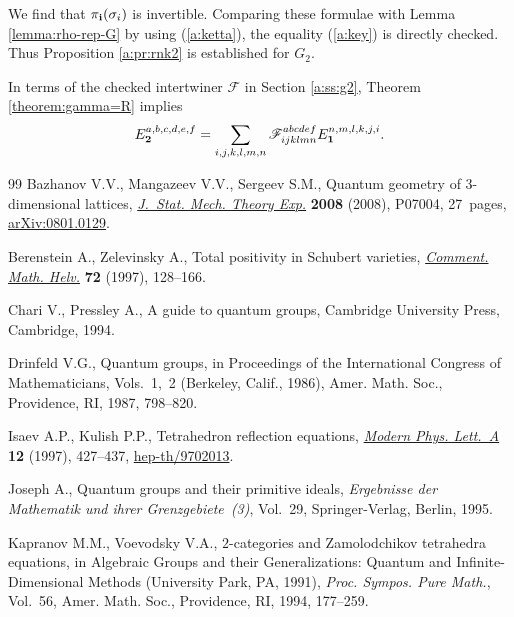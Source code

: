 \documentclass[11pt]{article}
\begin{document}
We f\/ind that $\pi_{\bf i}(\sigma_i)$ is invertible.
Comparing these formulae with Lemma \ref{lemma:rho-rep-G}
by using (\ref{a:ketta}), the equality (\ref{a:key}) is directly checked.
Thus Proposition \ref{a:pr:rnk2} is established for $G_2$.

In terms of the checked intertwiner $\mathscr{F}$ in Section \ref{a:ss:g2},
Theorem \ref{theorem:gamma=R} implies
\begin{gather*}
E^{a,b,c,d,e,f}_{\bf 2} = \sum_{i,j,k,l,m,n}
\mathscr{F}^{a b c d e f}_{i j k l m n} E^{n,m,l,k,j,i}_{\bf 1}.
\end{gather*}

\begin{thebibliography}{99}
Bazhanov V.V., Mangazeev V.V., Sergeev S.M., Quantum geometry of
  3-dimensional lattices, \href{http://dx.doi.org/10.1088/1742-5468/2008/07/P07004}{\textit{J.~Stat. Mech. Theory Exp.}} \textbf{2008}
  (2008), P07004, 27~pages, \href{http://arxiv.org/abs/0801.0129}{arXiv:0801.0129}.

Berenstein A., Zelevinsky A., Total positivity in {S}chubert varieties,
  \href{http://dx.doi.org/10.1007/PL00000363}{\textit{Comment. Math. Helv.}} \textbf{72} (1997), 128--166.

Chari V., Pressley A., A guide to quantum groups, Cambridge University Press,
  Cambridge, 1994.

Drinfeld V.G., Quantum groups, in Proceedings of the {I}nternational {C}ongress
  of {M}athematicians, {V}ols.~1,~2 ({B}erkeley, {C}alif., 1986), Amer. Math.
  Soc., Providence, RI, 1987, 798--820.

Isaev A.P., Kulish P.P., Tetrahedron ref\/lection equations, \href{http://dx.doi.org/10.1142/S0217732397000443}{\textit{Modern Phys.
  Lett.~A}} \textbf{12} (1997), 427--437, \mbox{\href{http://arxiv.org/abs/hep-th/9702013}{hep-th/9702013}}.

Joseph A., Quantum groups and their primitive ideals, \textit{Ergebnisse der
  Mathematik und ihrer Grenzge\-biete~(3)}, Vol.~29, Springer-Verlag, Berlin,
  1995.

Kapranov M.M., Voevodsky V.A., {$2$}-categories and {Z}amolodchikov tetrahedra
  equations, in Algebraic Groups and their Generalizations: Quantum and
  Inf\/inite-Dimensional Methods ({U}niversity {P}ark, {PA}, 1991), \textit{Proc.
  Sympos. Pure Math.}, Vol.~56, Amer. Math. Soc., Providence, RI, 1994,
  177--259.


\end{thebibliography}
\end{document}
